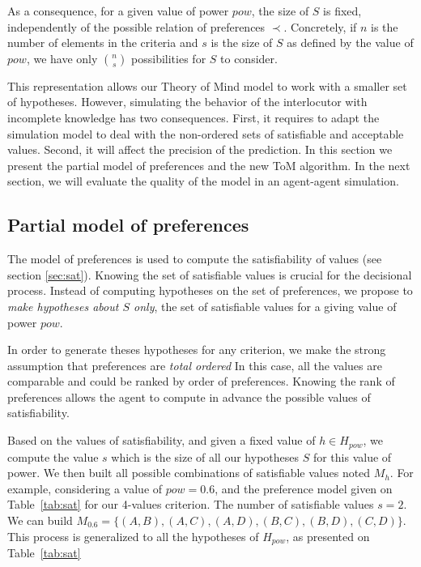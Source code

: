 \documentclass[conference, letterpaper]{IEEEtran}
\begin{document}
	As a consequence, for a given value of power $pow$, the size of $S$ is fixed, independently of the possible relation of preferences $\prec$. Concretely, if $n$ is the number of elements in the criteria and $s$ is the size of $S$ as defined by the value of $pow$, we have only $\binom{n}{s}$ possibilities for $S$ to consider.
	
	This representation allows our Theory of Mind model to work with a smaller set of hypotheses. However, simulating the behavior of the interlocutor with incomplete knowledge has two consequences. First, it requires to adapt the simulation model to deal with the non-ordered sets of satisfiable and acceptable values. Second, it will affect the precision of the prediction. In this section we present the partial model of preferences and the new ToM algorithm. In the next section, we will evaluate the quality of the model in an agent-agent simulation.
	
	\subsection{Partial model of preferences}
	
	The model of preferences is used to compute the satisfiability of values (see section \ref{sec:sat}). Knowing the set of satisfiable values is crucial for the decisional process. Instead of computing hypotheses on the set of preferences, we propose to \emph{make hypotheses about $S$ only}, the set of satisfiable values for a giving value of power $pow$.  
	
	In order to generate theses hypotheses for any criterion, we make the strong assumption that preferences are \emph{total ordered} In this case, all the values are comparable and could be ranked by order of preferences. Knowing the rank of preferences allows the agent to compute in advance the possible values of satisfiability.
	
	Based on the values of satisfiability, and given a fixed value of $h \in H_{pow}$, we compute the value $s$ which is the size of all our hypotheses $S$ for this value of power. We then built all possible combinations of satisfiable values  noted $M_h$. For example, considering a value of $pow =0.6$, and the preference model given on Table~\ref{tab:sat} for our 4-values criterion. The number of satisfiable values $s=2$. We can build $M_{0.6} = \{(A,B), (A,C), (A,D), (B,C), (B,D), (C,D)\}$. This process is generalized to all the hypotheses of $H_{pow}$, as presented on Table~\ref{tab:sat}
	
\end{document}
